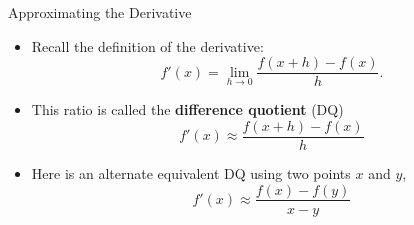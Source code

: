 \documentclass[10pt]{beamer}
\begin{document}
\begin{frame}{Approximating the Derivative}

\begin{itemize}
    \item  Recall the definition of the derivative:
\[
f'(x)
=
\lim_{h\to0}
\frac{f(x+h)-f(x)}{h}.
\]

\vfill

\item This ratio is called the \textbf{difference quotient} (DQ)
\[
f'(x) \approx \frac{f(x+h)-f(x)}{h}
\]

\vfill

\item Here is an alternate equivalent DQ using two points $x$ and $y$,
\[
\boxed{
f'(x)
\approx
\frac{f(x)-f(y)}{x-y}
}
\]
\end{itemize}
\end{frame}
\end{document}
